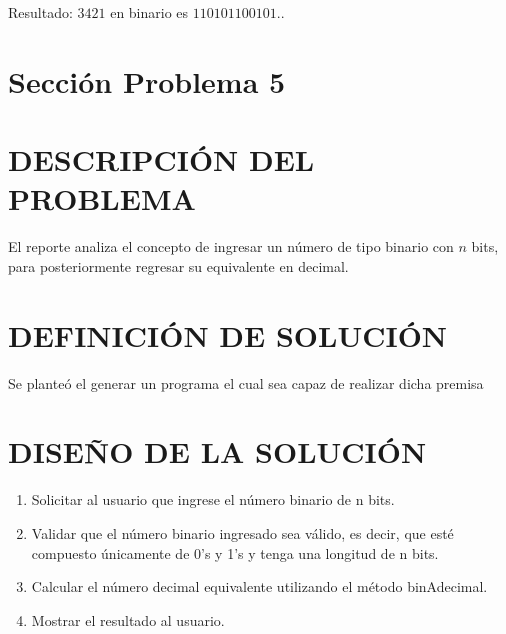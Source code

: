 \documentclass{IEEEcsmag}
\begin{document}
Resultado: \(3421\) en binario es \( 110101100101.\).
\newline
\newpage 
\newpage 




























































\section{Sección Problema 5}
\section{DESCRIPCIÓN DEL PROBLEMA}
El reporte analiza el concepto de ingresar un número de tipo binario con $n$ bits, para posteriormente regresar su equivalente en decimal.

\section{DEFINICIÓN DE SOLUCIÓN}
Se planteó el generar un programa el cual sea capaz de realizar dicha premisa

\section{DISEÑO DE LA SOLUCIÓN}
\begin{enumerate}
    \item Solicitar al usuario que ingrese el número binario de n bits.
    \item Validar que el número binario ingresado sea válido, es decir, que esté compuesto únicamente de 0's y 1's y tenga una longitud de n bits.
    \item Calcular el número decimal equivalente utilizando el método binAdecimal.
    \item Mostrar el resultado al usuario.
\end{enumerate}
\end{document}
